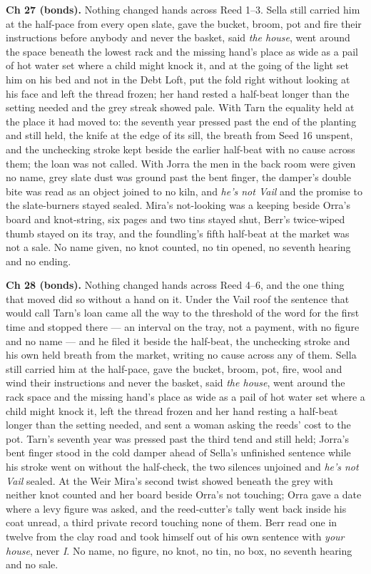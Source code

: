 \documentclass{design/chronicle}
\begin{document}
{\textbf{Ch 27 (bonds).} Nothing changed hands across Reed 1–3. Sella still carried him at the half-pace from every open slate, gave the bucket, broom, pot and fire their instructions before anybody and never the basket, said \emph{the house}, went around the space beneath the lowest rack and the missing hand’s place as wide as a pail of hot water set where a child might knock it, and at the going of the light set him on his bed and not in the Debt Loft, put the fold right without looking at his face and left the thread frozen; her hand rested a half-beat longer than the setting needed and the grey streak showed pale. With Tarn the equality held at the place it had moved to: the seventh year pressed past the end of the planting and still held, the knife at the edge of its sill, the breath from Seed 16 unspent, and the unchecking stroke kept beside the earlier half-beat with no cause across them; the loan was not called. With Jorra the men in the back room were given no name, grey slate dust was ground past the bent finger, the damper’s double bite was read as an object joined to no kiln, and \emph{he’s not Vail} and the promise to the slate-burners stayed sealed. Mira’s not-looking was a keeping beside Orra’s board and knot-string, six pages and two tins stayed shut, Berr’s twice-wiped thumb stayed on its tray, and the foundling’s fifth half-beat at the market was not a sale. No name given, no knot counted, no tin opened, no seventh hearing and no ending.

\textbf{Ch 28 (bonds).} Nothing changed hands across Reed 4–6, and the one thing that moved did so without a hand on it. Under the Vail roof the sentence that would call Tarn’s loan came all the way to the threshold of the word for the first time and stopped there — an interval on the tray, not a payment, with no figure and no name — and he filed it beside the half-beat, the unchecking stroke and his own held breath from the market, writing no cause across any of them. Sella still carried him at the half-pace, gave the bucket, broom, pot, fire, wool and wind their instructions and never the basket, said \emph{the house}, went around the rack space and the missing hand’s place as wide as a pail of hot water set where a child might knock it, left the thread frozen and her hand resting a half-beat longer than the setting needed, and sent a woman asking the reeds’ cost to the pot. Tarn’s seventh year was pressed past the third tend and still held; Jorra’s bent finger stood in the cold damper ahead of Sella’s unfinished sentence while his stroke went on without the half-check, the two silences unjoined and \emph{he’s not Vail} sealed. At the Weir Mira’s second twist showed beneath the grey with neither knot counted and her board beside Orra’s not touching; Orra gave a date where a levy figure was asked, and the reed-cutter’s tally went back inside his coat unread, a third private record touching none of them. Berr read one in twelve from the clay road and took himself out of his own sentence with \emph{your house}, never \emph{I}. No name, no figure, no knot, no tin, no box, no seventh hearing and no sale.

}
\end{document}
